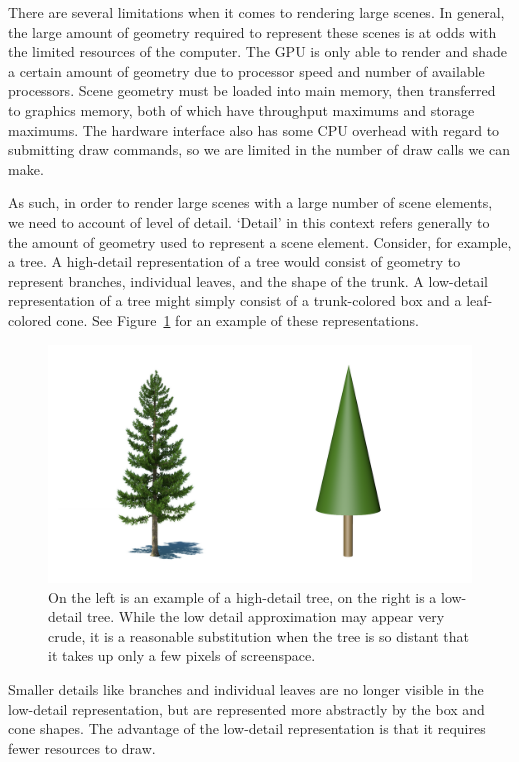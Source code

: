 There are several limitations when it comes to rendering large scenes.
In general, the large amount of geometry required to represent these scenes is at odds with the limited resources of the computer.
The GPU is only able to render and shade a certain amount of geometry due to processor speed and number of available processors.
Scene geometry must be loaded into main memory, then transferred to graphics memory, both of which have throughput maximums and storage maximums.
The hardware interface also has some CPU overhead with regard to submitting draw commands, so we are limited in the number of draw calls we can make.

As such, in order to render large scenes with a large number of scene elements, we need to account of level of detail.
`Detail' in this context refers generally to the amount of geometry used to represent a scene element.
Consider, for example, a tree.{}
A high-detail representation of a tree would consist of geometry to represent branches, individual leaves, and the shape of the trunk.
A low-detail representation of a tree might simply consist of a trunk-colored box and a leaf-colored cone.
See Figure~\ref{fig:trees} for an example of these representations.

\begin{figure}
	\centering
		\includegraphics[width=1.0\textwidth]{figures/TreeComparison.png}
	\caption{On the left is an example of a high-detail tree, on the right is a low-detail tree.
	While the low detail approximation may appear very crude, it is a reasonable substitution when the tree is so distant that it takes up only a few pixels of screenspace.}
	\label{fig:trees}
\end{figure}


Smaller details like branches and individual leaves are no longer visible in the low-detail representation, but are represented more abstractly by the box and cone shapes.
The advantage of the low-detail representation is that it requires fewer resources to draw.

